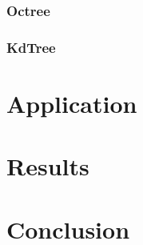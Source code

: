 \documentclass[a4paper,10pt,abstracton,notitlepage]{scrreprt}
\begin{document}
\subsection{Octree}
\subsection{KdTree}

\chapter{Application}

\chapter{Results}

\chapter{Conclusion}



\end{document}
